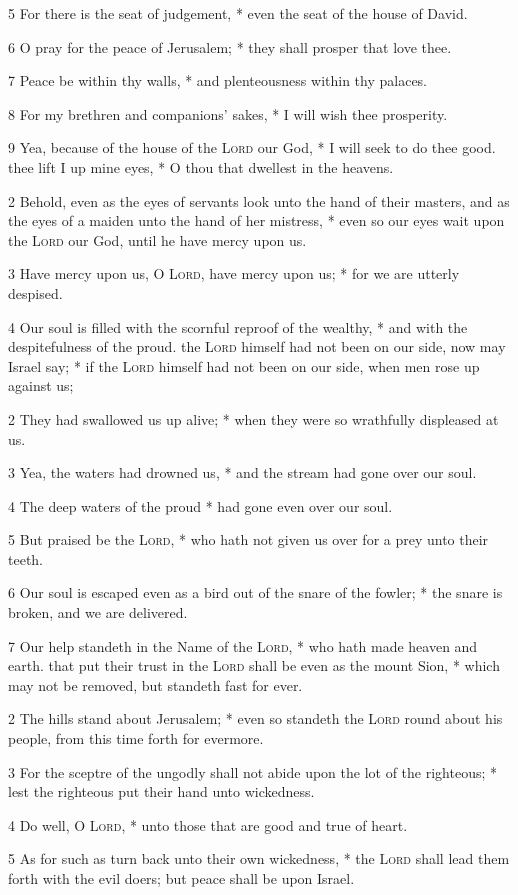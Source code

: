 5 For there is the seat of judgement, * even the seat of the house of David.\par
6 O pray for the peace of Jerusalem; * they shall prosper that love thee.\par
7 Peace be within thy walls, * and plenteousness within thy palaces.\par
8 For my brethren and companions' sakes, * I will wish thee prosperity.\par
9 Yea, because of the house of the {\textsc{Lord}} our God, * I will seek to do thee good.
 thee lift I up mine eyes, * O thou that dwellest in the heavens.\par
2 Behold, even as the eyes of servants look unto the hand of their masters, and as the eyes of a maiden unto the hand of her mistress, * even so our eyes wait upon the {\textsc{Lord}} our God, until he have mercy upon us.\par
3 Have mercy upon us, O {\textsc{Lord}}, have mercy upon us; * for we are utterly despised.\par
4 Our soul is filled with the scornful reproof of the wealthy, * and with the despitefulness of the proud.
 the {\textsc{Lord}} himself had not been on our side, now may Israel say; * if the {\textsc{Lord}} himself had not been on our side, when men rose up against us;\par
2 They had swallowed us up alive; * when they were so wrathfully displeased at us.\par
3 Yea, the waters had drowned us, * and the stream had gone over our soul.\par
4 The deep waters of the proud * had gone even over our soul.\par
5 But praised be the {\textsc{Lord}}, * who hath not given us over for a prey unto their teeth.\par
6 Our soul is escaped even as a bird out of the snare of the fowler; * the snare is broken, and we are delivered.\par
7 Our help standeth in the Name of the {\textsc{Lord}}, * who hath made heaven and earth.
 that put their trust in the {\textsc{Lord}} shall be even as the mount Sion, * which may not be removed, but standeth fast for ever.\par
2 The hills stand about Jerusalem; * even so standeth the {\textsc{Lord}} round about his people, from this time forth for evermore.\par
3 For the sceptre of the ungodly shall not abide upon the lot of the righteous; * lest the righteous put their hand unto wickedness.\par
4 Do well, O {\textsc{Lord}}, * unto those that are good and true of heart.\par
5 As for such as turn back unto their own wickedness, * the {\textsc{Lord}} shall lead them forth with the evil doers; but peace shall be upon Israel.
